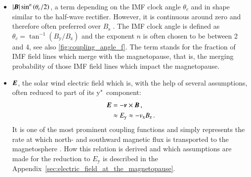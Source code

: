 \begin{itemize}
	\item $|\boldsymbol{B}| \sin^n\left(\theta_c / 2\right)$, a term depending on the IMF clock angle $\theta_c$ and in shape similar to the half-wave rectifier. However, it is continuous around zero and therefore often preferred over $B_\text{s}$ \citep{Lockwood2013}. The IMF clock angle is defined as $\theta_c = \tan^{-1}\left(B_\text{y} / B_\text{z}\right)$ and the exponent $n$ is often chosen to be between 2 and 4, see also \autoref{fig:coupling_angle_f}. The term stands for the fraction of IMF field lines which merge with the magnetopause, that is, the merging probability of those IMF field lines which impact the magnetopause.
	\begin{figure}[htb]
	\end{figure}
	
	\item $\boldsymbol{E}$, the solar wind electric field which is, with the help of several assumptions, often reduced to part of its y"~component:
	\begin{align}
		\boldsymbol{E} &= -\boldsymbol{v} \times \boldsymbol{B}	\,,\\
			&\approx E_\text{y} \approx -v_\text{x} B_\text{z}	\,.	\label{eq:coupling_vxBz}
	\end{align}
	It is one of the most prominent coupling functions and simply represents the rate at which north- and southward magnetic flux is transported to the magnetosphere \citep[p.~103]{Russell2007}. How this relation is derived and which assumptions are made for the reduction to $E_\text{y}$ is described in the Appendix~\ref{sec:electric_field_at_the_magnetopause}.
	

\end{itemize}
